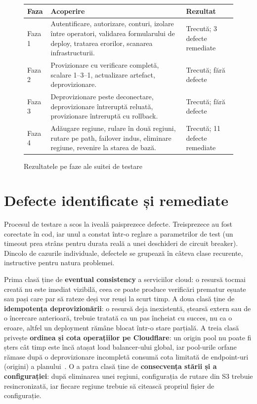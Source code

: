 \documentclass[12pt,a4paper]{report}
\begin{document}
\begin{figure}[H]
\centering
\begin{tabular}{@{}p{1.6cm}p{8.6cm}p{2.4cm}@{}}
\toprule
\textbf{Faza} & \textbf{Acoperire} & \textbf{Rezultat} \\
\midrule
Faza 1 & Autentificare, autorizare, conturi, izolare între operatori, validarea formularului de deploy, tratarea erorilor, scanarea infrastructurii. & Trecută; 3 defecte remediate \\
Faza 2 & Provizionare cu verificare completă, scalare 1--3--1, actualizare artefact, deprovizionare. & Trecută; fără defecte \\
Faza 3 & Deprovizionare peste deconectare, deprovizionare întreruptă reluată, provizionare întreruptă cu rollback. & Trecută; fără defecte \\
Faza 4 & Adăugare regiune, rulare în două regiuni, rutare pe path, failover indus, eliminare regiune, revenire la starea de bază. & Trecută; 11 defecte remediate \\
\bottomrule
\end{tabular}
\caption{Rezultatele pe faze ale suitei de testare}
\label{fig:rezultate}
\end{figure}

\section{Defecte identificate și remediate}
Procesul de testare a scos la iveală paisprezece defecte. Treisprezece au fost corectate în cod, iar unul a constat într-o reglare a parametrilor de test (un timeout prea strâns pentru durata reală a unei deschideri de circuit breaker). Dincolo de cazurile individuale, defectele se grupează în câteva clase recurente, instructive pentru natura problemei.

Prima clasă ține de \textbf{eventual consistency} a serviciilor cloud: o resursă tocmai creată nu este imediat vizibilă, ceea ce poate produce verificări prematur eșuate sau pași care par să rateze deși vor reuși la scurt timp. A doua clasă ține de \textbf{idempotența deprovizionării}: o resursă deja inexistentă, ștearsă extern sau de o încercare anterioară, trebuie tratată ca un pas încheiat cu succes, nu ca o eroare, altfel un deployment rămâne blocat într-o stare parțială. A treia clasă privește \textbf{ordinea și cota operațiilor pe Cloudflare}: un origin pool nu poate fi șters cât timp este încă atașat load balancer-ului global, iar pool-urile orfane rămase după o deprovizionare incompletă consumă cota limitată de endpoint-uri (origini) a planului~\cite{cloudflare-pools}. O a patra clasă ține de \textbf{consecvența stării și a configurației}: după eliminarea unei regiuni, configurația de rutare din S3 trebuie resincronizată, iar fiecare regiune trebuie să citească propriul fișier de configurație.
\end{document}
